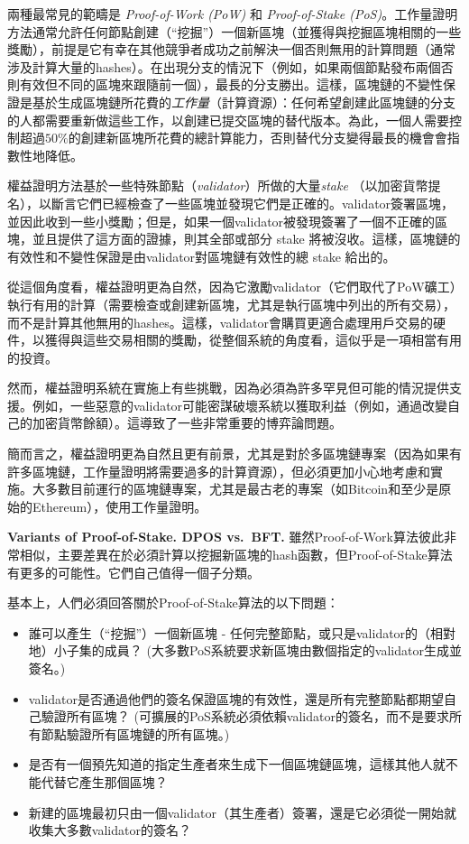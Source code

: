 \documentclass[12pt,oneside]{article}
\def\makepoint#1{\medbreak\noindent{\bf #1.\ }}
\def\nxsubpoint{\refstepcounter{subsubsection}%
  \smallbreak\makepoint{\thesubsubsection}}
\def\embt(#1.){\textbf{#1.}}
\begin{document}
兩種最常見的範疇是 {\em Proof-of-Work (PoW)} 和 {\em Proof-of-Stake (PoS)}。工作量證明方法通常允許任何節點創建（“挖掘”）一個新區塊（並獲得與挖掘區塊相關的一些獎勵），前提是它有幸在其他競爭者成功之前解決一個否則無用的計算問題（通常涉及計算大量的hashes）。在出現分支的情況下（例如，如果兩個節點發布兩個否則有效但不同的區塊來跟隨前一個），最長的分支勝出。這樣，區塊鏈的不變性保證是基於生成區塊鏈所花費的{\em 工作量}（計算資源）：任何希望創建此區塊鏈的分支的人都需要重新做這些工作，以創建已提交區塊的替代版本。為此，一個人需要控制超過$50\%$的創建新區塊所花費的總計算能力，否則替代分支變得最長的機會會指數性地降低。

權益證明方法基於一些特殊節點（{\em validator}）所做的大量{\em  stake }（以加密貨幣提名），以斷言它們已經檢查了一些區塊並發現它們是正確的。validator簽署區塊，並因此收到一些小獎勵；但是，如果一個validator被發現簽署了一個不正確的區塊，並且提供了這方面的證據，則其全部或部分 stake 將被沒收。這樣，區塊鏈的有效性和不變性保證是由validator對區塊鏈有效性的總 stake 給出的。

從這個角度看，權益證明更為自然，因為它激勵validator（它們取代了PoW礦工）執行有用的計算（需要檢查或創建新區塊，尤其是執行區塊中列出的所有交易），而不是計算其他無用的hashes。這樣，validator會購買更適合處理用戶交易的硬件，以獲得與這些交易相關的獎勵，從整個系統的角度看，這似乎是一項相當有用的投資。

然而，權益證明系統在實施上有些挑戰，因為必須為許多罕見但可能的情況提供支援。例如，一些惡意的validator可能密謀破壞系統以獲取利益（例如，通過改變自己的加密貨幣餘額）。這導致了一些非常重要的博弈論問題。

簡而言之，權益證明更為自然且更有前景，尤其是對於多區塊鏈專案（因為如果有許多區塊鏈，工作量證明將需要過多的計算資源），但必須更加小心地考慮和實施。大多數目前運行的區塊鏈專案，尤其是最古老的專案（如Bitcoin和至少是原始的Ethereum），使用工作量證明。

\nxsubpoint\label{sp:dpos.bft} \embt(Variants of Proof-of-Stake. DPOS
vs.\ BFT.) 雖然Proof-of-Work算法彼此非常相似，主要差異在於必須計算以挖掘新區塊的hash函數，但Proof-of-Stake算法有更多的可能性。它們自己值得一個子分類。

基本上，人們必須回答關於Proof-of-Stake算法的以下問題：
\begin{itemize}
\item 誰可以產生（“挖掘”）一個新區塊 - 任何完整節點，或只是validator的（相對地）小子集的成員？ (大多數PoS系統要求新區塊由數個指定的validator生成並簽名。)
\item validator是否通過他們的簽名保證區塊的有效性，還是所有完整節點都期望自己驗證所有區塊？ (可擴展的PoS系統必須依賴validator的簽名，而不是要求所有節點驗證所有區塊鏈的所有區塊。)
\item 是否有一個預先知道的指定生產者來生成下一個區塊鏈區塊，這樣其他人就不能代替它產生那個區塊？
\item 新建的區塊最初只由一個validator（其生產者）簽署，還是它必須從一開始就收集大多數validator的簽名？
\end{itemize}
\end{document}
